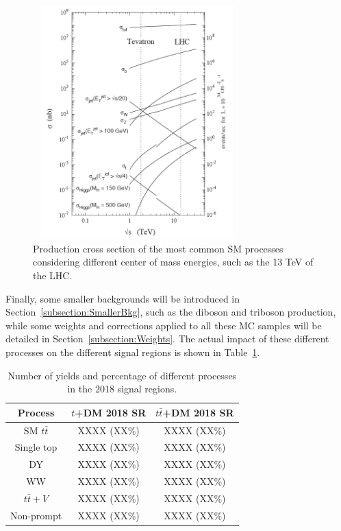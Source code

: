 \documentclass[a4paper, 10pt, openright]{report}
\begin{document}
\begin{figure}[htbp]
\begin{center}
\includegraphics[width=8cm, height=9cm]{figs/ProcessesXS.png}
\caption{Production cross section of the most common \ac{SM} processes considering different center of mass energies, such as the 13 TeV of the \ac{LHC}.}
\label{fig:ProcessesXS}
\end{center}
\end{figure}

Finally, some smaller backgrounds will be introduced in Section~\ref{subsection:SmallerBkg}, such as the diboson and triboson production, while some weights and corrections applied to all these \ac{MC} samples will be detailed in Section~\ref{subsection:Weights}. The actual impact of these different processes on the different signal regions is shown in Table~\ref{tab:yields}.

\begin{table}
\begin{center}
\begin{tabular}{ c|c|c } 
 \hline
 Process & $t$+DM 2018 \ac{SR} & $t \bar t$+DM 2018 \ac{SR} \\
 \hline
 \ac{SM} $t \bar t$ & XXXX (XX\%) & XXXX (XX\%) \\
 Single top & XXXX (XX\%) & XXXX (XX\%) \\
 DY & XXXX (XX\%) & XXXX (XX\%) \\
 WW & XXXX (XX\%) & XXXX (XX\%) \\
 $t \bar t + V$ & XXXX (XX\%) & XXXX (XX\%) \\
 Non-prompt & XXXX (XX\%) & XXXX (XX\%) \\
 \hline
\end{tabular}
\caption{Number of yields and percentage of different processes in the 2018 signal regions.}
\label{tab:yields}
\end{center}
\end{table}	
\end{document}
